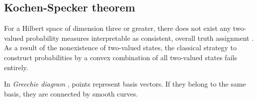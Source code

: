 \subsection{Kochen-Specker theorem}
\label{2011-m-KST}

For a Hilbert space of dimension three or greater,
there does not exist any
two-valued probability measures interpretable as consistent, overall truth assignment
\cite{specker-60,kochen1}.
As a result of the nonexistence of two-valued states, the classical strategy
to construct probabilities by a convex combination of all two-valued states fails entirely.

In  {\em Greechie diagram} \cite{greechie:71},
points  represent basis vectors.
If they belong to the same basis, they are connected by  smooth curves.

